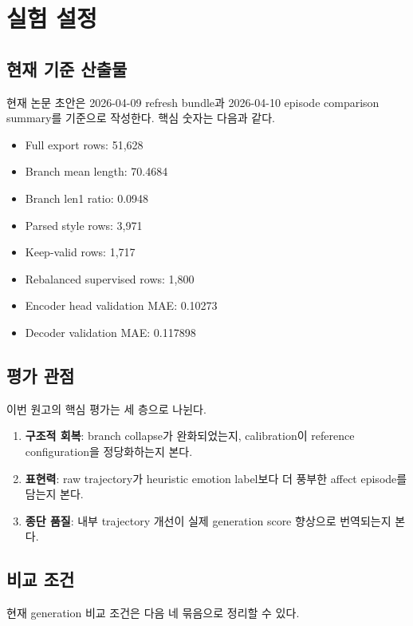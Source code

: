 \section{실험 설정}

\subsection{현재 기준 산출물}

현재 논문 초안은 2026-04-09 refresh bundle과 2026-04-10 episode comparison summary를 기준으로 작성한다. 핵심 숫자는 다음과 같다.

\begin{itemize}
  \item Full export rows: 51,628
  \item Branch mean length: 70.4684
  \item Branch len1 ratio: 0.0948
  \item Parsed style rows: 3,971
  \item Keep-valid rows: 1,717
  \item Rebalanced supervised rows: 1,800
  \item Encoder head validation MAE: 0.10273
  \item Decoder validation MAE: 0.117898
\end{itemize}

\subsection{평가 관점}

이번 원고의 핵심 평가는 세 층으로 나뉜다.

\begin{enumerate}
  \item \textbf{구조적 회복}: branch collapse가 완화되었는지, calibration이 reference configuration을 정당화하는지 본다.
  \item \textbf{표현력}: raw trajectory가 heuristic emotion label보다 더 풍부한 affect episode를 담는지 본다.
  \item \textbf{종단 품질}: 내부 trajectory 개선이 실제 generation score 향상으로 번역되는지 본다.
\end{enumerate}

\subsection{비교 조건}

현재 generation 비교 조건은 다음 네 묶음으로 정리할 수 있다.

